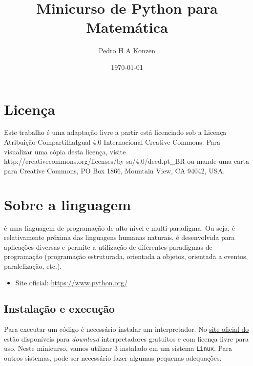 \documentclass[12pt]{article}
\begin{document}
\title{Minicurso de Python para Matemática}
\author{Pedro H A Konzen}
\date{\today}

\maketitle

\tableofcontents

\section*{Licença}\label{sec_licenca}

Este trabalho é uma adaptação livre a partir está licenciado sob a Licença Atribuição-CompartilhaIgual 4.0 Internacional Creative Commons. Para visualizar uma cópia desta licença, visite http://creativecommons.org/licenses/by-sa/4.0/deed.pt\_BR ou mande uma carta para Creative Commons, PO Box 1866, Mountain View, CA 94042, USA.


\section{Sobre a linguagem}\label{sec_sobrepy}

{\python} é uma linguagem de programação de alto nível e multi-paradigma. Ou seja, é relativamente próxima das linguagens humanas naturais, é desenvolvida para aplicações diversas e permite a utilização de diferentes paradigmas de programação (programação estruturada, orientada a objetos, orientada a eventos, paralelização, etc.).

\begin{itemize}
\item Site oficial: \href{https://www.python.org/}{https://www.python.org/}
\end{itemize}

\subsection{Instalação e execução}

Para executar um código {\python} é necessário instalar um interpretador. No \href{https://www.python.org/}{site oficial do \python} estão disponíveis para {\it download} interpretadores gratuitos e com licença livre para uso. Neste minicurso, vamos utilizar {\python} 3 instalado em um sistema \verb+Linux+. Para outros sistemas, pode ser necessário fazer algumas pequenas adequações.
\end{document}
